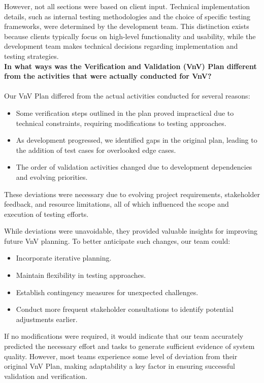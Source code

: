 \documentclass[12pt, titlepage]{article}
\begin{document}
  \newline
  However, not all sections were based on client input. Technical implementation details, such as internal testing methodologies and the choice of specific testing frameworks, were determined by the development team. This distinction exists because clients typically focus on high-level functionality and usability, while the development team makes technical decisions regarding implementation and testing strategies. \\ 
  \newline \textbf{In what ways was the Verification and Validation (VnV) Plan different from the activities that were actually conducted for VnV?} \\\\
  Our VnV Plan differed from the actual activities conducted for several reasons:
  \begin{itemize}
      \item Some verification steps outlined in the plan proved impractical due to technical constraints, requiring modifications to testing approaches.
      \item As development progressed, we identified gaps in the original plan, leading to the addition of test cases for overlooked edge cases.
      \item The order of validation activities changed due to development dependencies and evolving priorities.
  \end{itemize}
  
  These deviations were necessary due to evolving project requirements, stakeholder feedback, and resource limitations, all of which influenced the scope and execution of testing efforts.
  
  While deviations were unavoidable, they provided valuable insights for improving future VnV planning. To better anticipate such changes, our team could:
  \begin{itemize}
      \item Incorporate iterative planning.
      \item Maintain flexibility in testing approaches.
      \item Establish contingency measures for unexpected challenges.
      \item Conduct more frequent stakeholder consultations to identify potential adjustments earlier.
  \end{itemize}
  
  If no modifications were required, it would indicate that our team accurately predicted the necessary effort and tasks to generate sufficient evidence of system quality. However, most teams experience some level of deviation from their original VnV Plan, making adaptability a key factor in ensuring successful validation and verification.  
\end{document}
